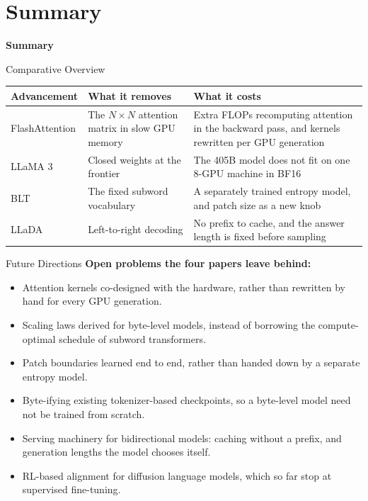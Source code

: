 \section{Summary}
\begin{frame}{}
    \LARGE \textbf{Summary}
\end{frame}

\begin{frame}{Comparative Overview}
    \begin{table}[]
        \centering
        \small
        \begin{tabular}{|l|p{4.5cm}|p{5.5cm}|}
            \hline
            \textbf{Advancement} & \textbf{What it removes} & \textbf{What it costs} \\
            \hline
            FlashAttention & The $N \times N$ attention matrix in slow GPU memory & Extra FLOPs recomputing attention in the backward pass, and kernels rewritten per GPU generation \\
            \hline
            LLaMA 3 & Closed weights at the frontier & The 405B model does not fit on one 8-GPU machine in BF16 \\
            \hline
            BLT & The fixed subword vocabulary & A separately trained entropy model, and patch size as a new knob \\
            \hline
            LLaDA & Left-to-right decoding & No prefix to cache, and the answer length is fixed before sampling \\
            \hline
        \end{tabular}
    \end{table}
\end{frame}

\begin{frame}{Future Directions}
    \textbf{Open problems the four papers leave behind:}
    \begin{itemize}
        \item Attention kernels co-designed with the hardware, rather than rewritten by hand for every GPU generation.
        \item Scaling laws derived for byte-level models, instead of borrowing the compute-optimal schedule of subword transformers.
        \item Patch boundaries learned end to end, rather than handed down by a separate entropy model.
        \item Byte-ifying existing tokenizer-based checkpoints, so a byte-level model need not be trained from scratch.
        \item Serving machinery for bidirectional models: caching without a prefix, and generation lengths the model chooses itself.
        \item RL-based alignment for diffusion language models, which so far stop at supervised fine-tuning.
    \end{itemize}
\end{frame}

